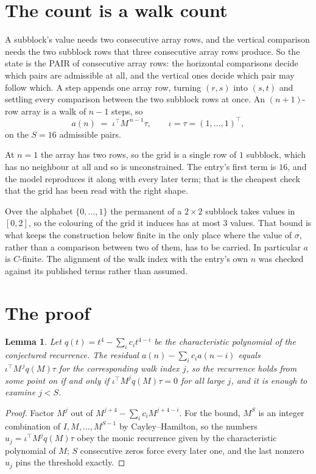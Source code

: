 \documentclass[11pt,a4paper]{article}
\theoremstyle{plain}
\newtheorem{lemma}[theorem]{Lemma}
\theoremstyle{definition}
\begin{document}
\section{The count is a walk count}

A subblock's value needs two consecutive array rows, and the vertical
comparison needs the two subblock rows that three consecutive array rows produce. So the state
is the PAIR of consecutive array rows: the horizontal comparisons decide which pairs are
admissible at all, and the vertical ones decide which pair may follow which. A step appends one
array row, turning $(r,s)$ into $(s,t)$ and settling every comparison between the two subblock
rows at once. An $(n+1)$-row array is a walk of $n-1$ steps, so
\[
a(n)\;=\;\iota^{\!\top}M^{\,n-1}\tau,\qquad\iota=\tau=(1,\dots,1)^{\!\top},
\]
on the $S=16$ admissible pairs.

At $n=1$ the array has two rows, so the grid is a single row of $1$
subblock, which has no neighbour at all and so is unconstrained. The
entry's first term is $16$, and the model reproduces it along with every later term; that
is the cheapest check that the grid has been read with the right shape.

Over the alphabet $\{0,\dots,1\}$ the permanent of a $2\times2$ subblock takes values in
$[0,2]$, so the colouring of the grid it induces has at most $3$ values.
That bound is what keeps the construction below finite in the only place where the value of
$\sigma$, rather than a comparison between two of them, has to be carried.
In particular $a$ is $C$-finite. The alignment of the walk index with the entry's own $n$ was
checked against its published terms rather than assumed.

\section{The proof}

\begin{lemma}\label{lem:crit}
Let $q(t)=t^{4}-\sum_i c_it^{4-i}$ be the characteristic polynomial of the
conjectured recurrence. The residual $a(n)-\sum_ic_ia(n-i)$ equals
$\iota^{\!\top}M^{\,j}q(M)\tau$ for the corresponding walk index $j$, so the recurrence
holds from some point on if and only if $\iota^{\!\top}M^{j}q(M)\tau=0$ for all large $j$,
and it is enough to examine $j<S$.
\end{lemma}

\begin{proof}
Factor $M^{j}$ out of $M^{j+4}-\sum_ic_iM^{j+4-i}$. For the bound, $M^{S}$
is an integer combination of $I,M,\dots,M^{S-1}$ by Cayley--Hamilton, so the numbers
$u_j=\iota^{\!\top}M^{j}q(M)\tau$ obey the monic recurrence given by the characteristic
polynomial of $M$; $S$ consecutive zeros force every later one, and the last nonzero $u_j$
pins the threshold exactly.
\end{proof}
\end{document}
